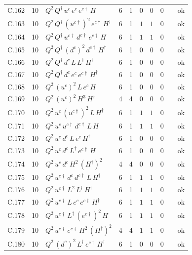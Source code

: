 {\begin{longtable}{@{}ll>{\raggedright\arraybackslash}p{6.4cm}rrllllr@{}}
C.162 & 10 & $Q^{2}\,Q^\dagger\,u^c\,e^c\,e^{c\dagger}\,H$ & 6 & 1 & $0$ & $0$ & $0$ &  & ok \\
C.163 & 10 & $Q^{2}\,Q^\dagger\,(u^{c\dagger})^{2}\,e^{c\dagger}\,H^\dagger$ & 6 & 1 & $1$ & $1$ & $0$ &  & ok \\
C.164 & 10 & $Q^{2}\,Q^\dagger\,u^{c\dagger}\,d^{c\dagger}\,e^{c\dagger}\,H$ & 6 & 1 & $1$ & $1$ & $0$ &  & ok \\
C.165 & 10 & $Q^{2}\,Q^\dagger\,(d^c)^{2}\,d^{c\dagger}\,H^\dagger$ & 6 & 1 & $0$ & $0$ & $0$ &  & ok \\
C.166 & 10 & $Q^{2}\,Q^\dagger\,d^c\,L\,L^\dagger\,H^\dagger$ & 6 & 1 & $0$ & $0$ & $0$ &  & ok \\
C.167 & 10 & $Q^{2}\,Q^\dagger\,d^c\,e^c\,e^{c\dagger}\,H^\dagger$ & 6 & 1 & $0$ & $0$ & $0$ &  & ok \\
C.168 & 10 & $Q^{2}\,(u^c)^{2}\,L\,e^c\,H$ & 6 & 1 & $0$ & $0$ & $0$ &  & ok \\
C.169 & 10 & $Q^{2}\,(u^c)^{2}\,H^{3}\,H^\dagger$ & 4 & 4 & $0$ & $0$ & $0$ &  & ok \\
C.170 & 10 & $Q^{2}\,u^c\,(u^{c\dagger})^{2}\,L\,H^\dagger$ & 6 & 1 & $1$ & $1$ & $0$ &  & ok \\
C.171 & 10 & $Q^{2}\,u^c\,u^{c\dagger}\,d^{c\dagger}\,L\,H$ & 6 & 1 & $1$ & $1$ & $0$ &  & ok \\
C.172 & 10 & $Q^{2}\,u^c\,d^c\,L\,e^c\,H^\dagger$ & 6 & 1 & $0$ & $0$ & $0$ &  & ok \\
C.173 & 10 & $Q^{2}\,u^c\,d^c\,L^\dagger\,e^{c\dagger}\,H$ & 6 & 1 & $0$ & $0$ & $0$ &  & ok \\
C.174 & 10 & $Q^{2}\,u^c\,d^c\,H^{2}\,(H^\dagger)^{2}$ & 4 & 4 & $0$ & $0$ & $0$ &  & ok \\
C.175 & 10 & $Q^{2}\,u^{c\dagger}\,d^c\,d^{c\dagger}\,L\,H^\dagger$ & 6 & 1 & $1$ & $1$ & $0$ &  & ok \\
C.176 & 10 & $Q^{2}\,u^{c\dagger}\,L^{2}\,L^\dagger\,H^\dagger$ & 6 & 1 & $1$ & $1$ & $0$ &  & ok \\
C.177 & 10 & $Q^{2}\,u^{c\dagger}\,L\,e^c\,e^{c\dagger}\,H^\dagger$ & 6 & 1 & $1$ & $1$ & $0$ &  & ok \\
C.178 & 10 & $Q^{2}\,u^{c\dagger}\,L^\dagger\,(e^{c\dagger})^{2}\,H$ & 6 & 1 & $1$ & $1$ & $0$ &  & ok \\
C.179 & 10 & $Q^{2}\,u^{c\dagger}\,e^{c\dagger}\,H^{2}\,(H^\dagger)^{2}$ & 4 & 4 & $1$ & $1$ & $0$ &  & ok \\
C.180 & 10 & $Q^{2}\,(d^c)^{2}\,L^\dagger\,e^{c\dagger}\,H^\dagger$ & 6 & 1 & $0$ & $0$ & $0$ &  & ok \\

\end{longtable}}
